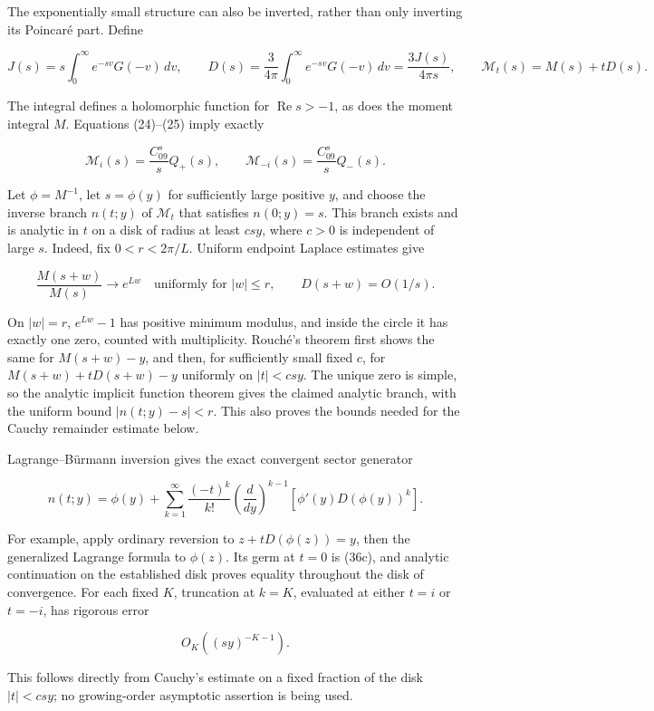 \documentclass[11pt,letterpaper]{article}
\theoremstyle{remark}
\begin{document}
The exponentially small structure can also be inverted, rather than only
inverting its Poincaré part. Define

\[
J(s)=s\int_0^\infty e^{-sv}G(-v)\,dv,
\qquad D(s)=\frac{3}{4\pi}\int_0^\infty e^{-sv}G(-v)\,dv=\frac{3J(s)}{4\pi s},
\qquad \mathcal M_t(s)=M(s)+tD(s).
\tag{36a}
\]

The integral defines a holomorphic function for
\(\operatorname{Re}s>-1\), as does the moment integral \(M\). Equations
(24)--(25) imply exactly

\[
\mathcal M_i(s)=\frac{C_09^s}{s}Q_+(s),\qquad
\mathcal M_{-i}(s)=\frac{C_09^s}{s}Q_-(s).
\tag{36b}
\]

Let \(\phi=M^{-1}\), let \(s=\phi(y)\) for sufficiently large positive
\(y\), and choose the inverse branch \(n(t;y)\) of \(\mathcal M_t\) that
satisfies \(n(0;y)=s\). This branch exists and is analytic in \(t\) on a
disk of radius at least \(csy\), where \(c>0\) is independent of large
\(s\). Indeed, fix \(0<r<2\pi/L\). Uniform endpoint Laplace estimates
give

\[
\frac{M(s+w)}{M(s)}\longrightarrow e^{Lw}
\quad\text{uniformly for }|w|\le r,
\qquad D(s+w)=O(1/s).
\]

On \(|w|=r\), \(e^{Lw}-1\) has positive minimum modulus, and inside the
circle it has exactly one zero, counted with multiplicity. Rouché's
theorem first shows the same for \(M(s+w)-y\), and then, for
sufficiently small fixed \(c\), for \(M(s+w)+tD(s+w)-y\) uniformly on
\(|t|<csy\). The unique zero is simple, so the analytic implicit
function theorem gives the claimed analytic branch, with the uniform
bound \(|n(t;y)-s|<r\). This also proves the bounds needed for the
Cauchy remainder estimate below.

Lagrange--Bürmann inversion gives the exact convergent sector generator

\[
\boxed{\displaystyle
n(t;y)=\phi(y)+\sum_{k=1}^\infty\frac{(-t)^k}{k!}
\left(\frac d{dy}\right)^{k-1}
\left[\phi'(y)D(\phi(y))^k\right].}
\tag{36c}
\]

For example, apply ordinary reversion to \(z+tD(\phi(z))=y\), then the
generalized Lagrange formula to \(\phi(z)\). Its germ at \(t=0\) is
(36c), and analytic continuation on the established disk proves equality
throughout the disk of convergence. For each fixed \(K\), truncation at
\(k=K\), evaluated at either \(t=i\) or \(t=-i\), has rigorous error

\[
O_K((sy)^{-K-1}).
\tag{36d}
\]

This follows directly from Cauchy's estimate on a fixed fraction of the
disk \(|t|<csy\); no growing-order asymptotic assertion is being used.
\end{document}
